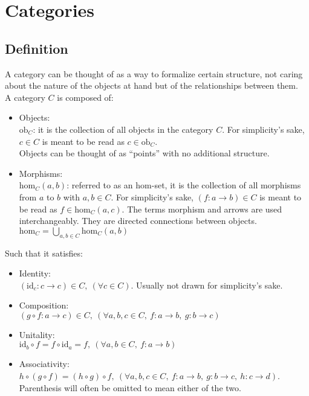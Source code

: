 \section{Categories}

\subsection{Definition}
A category can be thought of as a way to formalize certain structure, not caring
about the nature of the objects at hand but of the relationships between them.\\
A category $C$ is composed of: \parencite{fong_spivak:7sketches}
\begin{itemize}
  \item Objects:\\
    $\mathrm{ob}_C$: it is the collection of all objects in the category $C$.
    For simplicity's sake, $c\in C$ is meant to be read as $c\in
    \mathrm{ob}_C$.\\
    Objects can be thought of as ``points'' with no additional structure.
  \item Morphisms:\\
    $\mathrm{hom}_C(a, b)$: referred to as an hom-set, it is the collection of
    all morphisms from $a$ to $b$ with $a,b\in C$. For simplicity's sake, $(f: a
    \to b) \in C$ is meant to be read as $f \in \mathrm{hom}_C(a,c)$. The terms
    morphism and arrows are used interchangeably. They are directed connections
    between objects.\\
    $\mathrm{hom}_C = \bigcup\limits_{a,b\in C} \mathrm{hom}_C(a,b)$
\end{itemize}

Such that it satisfies:
\begin{itemize}
  \item Identity:\\
    $(\mathrm{id}_c: c \to c) \in C,\ (\forall c \in C)$. Usually not drawn for
    simplicity's sake.
  \item Composition:\\
    $(g \circ f : a \to c) \in C,
      \ (\forall a, b, c \in C,\ f: a \to b,\ g:b \to c)$
  \item Unitality:\\
    $\mathrm{id}_b \circ f = f \circ \mathrm{id}_a = f,
      \ (\forall a, b \in C,\ f: a \to b)$
  \item Associativity:\\
    $h \circ (g \circ f) = (h \circ g) \circ f, \ (\forall a,b,c\in C,\ f:a\to
      b,\ g:b\to c,\ h:c\to d)$. Parenthesis will often be omitted to mean
      either of the two.
\end{itemize}


